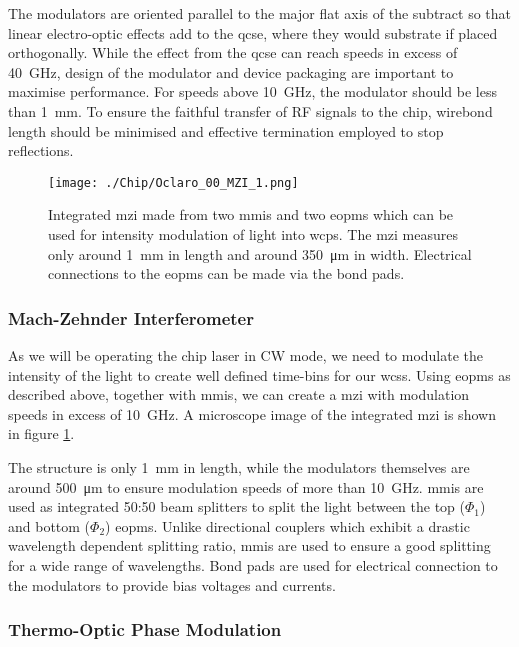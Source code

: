 The modulators are oriented parallel to the major flat axis of the subtract so that linear electro-optic effects add to the \ac{qcse}, where they would substrate if placed orthogonally. While the effect from the \ac{qcse} can reach speeds in excess of \SI{40}{GHz}, design of the modulator and device packaging are important to maximise performance. For speeds above \SI{10}{GHz}, the modulator should be less than \SI{1}{mm}. To ensure the faithful transfer of RF signals to the chip, wirebond length should be minimised and effective termination employed to stop reflections.

\begin{figure}[tp]
	\centering
	\texttt{[image: ./Chip/Oclaro\_00\_MZI\_1.png]}
	\caption[Microscope image of an integrated Mach-Zehnder interferometer]{Integrated \acl{mzi} made from two \acsp{mmi} and two \acsp{eopm} which can be used for intensity modulation of light into \acp{wcp}. The \ac{mzi} measures only around \SI{1}{\mm} in length and around \SI{350}{\micro\metre} in width. Electrical connections to the \acp{eopm} can be made via the bond pads.}
	\label{fig:InP_MZI}
\end{figure}

\subsubsection{Mach-Zehnder Interferometer}

As we will be operating the chip laser in \ac{CW} mode, we need to modulate the intensity of the light to create well defined time-bins for our \acp{wcs}. Using \acp{eopm} as described above, together with \acp{mmi}, we can create a \ac{mzi} with modulation speeds in excess of \SI{10}{GHz}. A microscope image of the integrated \ac{mzi} is shown in figure \ref{fig:InP_MZI}.

The structure is only \SI{1}{mm} in length, while the modulators themselves are around \SI{500}{\um} to ensure modulation speeds of more than \SI{10}{GHz}. \Acp{mmi} are used as integrated {50:50} beam splitters to split the light between the top ($\Phi_1$) and bottom ($\Phi_2$) \acp{eopm}. Unlike directional couplers which exhibit a drastic wavelength dependent splitting ratio, \acp{mmi} are used to ensure a good splitting for a wide range of wavelengths. Bond pads are used for electrical connection to the modulators to provide bias voltages and currents.

\subsubsection{Thermo-Optic Phase Modulation}

